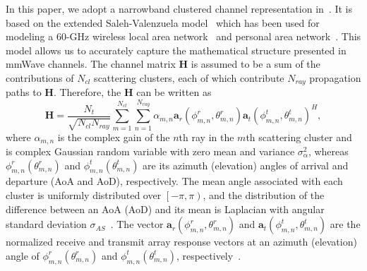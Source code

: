 \documentclass[11pt,draftcls,onecolumn]{IEEEtran}
\begin{document}
In this paper, we adopt a narrowband clustered channel representation in~\cite{TWCAyach2014}. It is based on the extended Saleh-Valenzuela model~\cite{BookClerkx2013} which has been used for modeling a 60-GHz wireless local area network~\cite{OnlineMat2011} and personal area network~\cite{OnlineYong2010}. This model allows us to accurately capture the mathematical structure presented in mmWave channels. The channel matrix $\bm{H}$ is assumed to be a sum of the contributions of $N_{cl}$ scattering clusters, each of which contribute $N_{ray}$ propagation paths to $\bm{H}$. Therefore, the $\bm{H}$ can be written as
\begin{equation}\label{SplitBeam07}
\bm{H}=\frac{N_{t}}{\sqrt{N_{cl}N_{ray}}}\sum\limits_{m=1}^{N_{cl}}\sum\limits_{n=1}^{N_{ray}}\alpha_{m,n}
\bm{a}_{r}\left(\phi_{m,n}^{r},\theta_{m,n}^{r}\right)\bm{a}_{t}\left(\phi_{m,n}^{t},\theta_{m,n}^{t}\right)^{H},
\end{equation}
where $\alpha_{m,n}$ is the complex gain of the $n$th ray in the $m$th scattering cluster and is complex Gaussian random variable with zero mean and variance $\sigma_{\alpha}^{2}$, whereas $\phi_{m,n}^{r}\left(\theta_{m,n}^{r}\right)$ and $\phi_{m,n}^{t}\left(\theta_{m,n}^{t}\right)$ are its azimuth (elevation) angles of arrival and departure (AoA and AoD), respectively. The mean angle associated with each cluster is uniformly distributed over $\left[-\pi, \pi\right)$, and the distribution of the difference between an AoA (AoD) and its mean is Laplacian with angular standard deviation $\sigma_{AS}$~\cite{TVTForenza2007,JSACXu2002,TNSingh2011}. The vector $\bm{a}_{r}\left(\phi_{m,n}^{r},\theta_{m,n}^{r}\right)$ and $\bm{a}_{t}\left(\phi_{m,n}^{t},\theta_{m,n}^{t}\right)$ are the normalized receive and transmit array response vectors at an azimuth (elevation) angle of $\phi_{m,n}^{r}\left(\theta_{m,n}^{r}\right)$ and $\phi_{m,n}^{t}\left(\theta_{m,n}^{t}\right)$, respectively~\cite{TWCAyach2014,JSTSPAlk2014,TWCAlk2015,TSPLee2015,TVTKim2015}.
\end{document}
